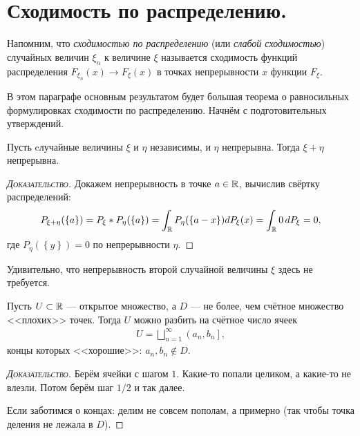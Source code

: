 \documentclass[../main.tex]{subfiles}
\begin{document}
\newpage
\section{Сходимость по распределению.}

Напомним, что \textit{сходимостью по распределению} (или \textit{слабой сходимостью}) случайных величин $ \xi_n $ к величине $ \xi $ называется сходимость функций распределения $ F_{\xi_n}(x) \to F_\xi(x) $ в точках непрерывности $ x $ функции $ F_\xi $.

В этом параграфе основным результатом будет большая теорема о равносильных формулировках сходимости по распределению. Начнём с подготовительных утверждений.

\begin{remrk}
 Пусть cлучайные величины $ \xi $ и $ \eta $ независимы, и $ \eta $ непрерывна. Тогда $ \xi + \eta $ непрерывна.
\end{remrk}
\begin{proof}[\normalfont\textsc{Доказательство}]
 Докажем непрерывность в точке $ a \in \mathbb{R} $, вычислив свёртку распределений:
 \begin{align*}
  P_{\xi+\eta}(\left\{ a \right\}) = P_\xi \ast P_\eta(\left\{ a \right\}) = \int_{\mathbb{R}} P_{\eta}(\left\{ a-x \right\}) dP_\xi(x) = \int_{\mathbb{R}} 0\,dP_\xi = 0, 
 \end{align*} где $ P_\eta(\left\{ y \right\}) = 0 $ по непрерывности $ \eta $.
\end{proof}

Удивительно, что непрерывность второй случайной величины $ \xi $ здесь не требуется.

\begin{remrk}
 \label{remark:open_set_partitioned_into_cells_with_countable_bad_points}
 Пусть $ U \subset \mathbb{R} $ --- открытое множество, а $ D $  --- не более, чем счётное множество <<плохих>> точек. Тогда $ U $ можно разбить на счётное число ячеек
 \begin{align*}
  U = \bigsqcup_{n=1}^{\infty} \left(a_n, b_n\right],
 \end{align*} концы которых <<хорошие>>: $ a_n, b_n \notin D $.
\end{remrk}
\begin{proof}[\normalfont\textsc{Доказательство}]
 Берём ячейки с шагом $ 1 $. Какие-то попали целиком, а какие-то не влезли. Потом берём шаг $ 1 / 2 $ и так далее.

 Если заботимся о концах: делим не совсем пополам, а примерно (так чтобы точка деления не лежала в $ D $).
\end{proof}
\end{document}
